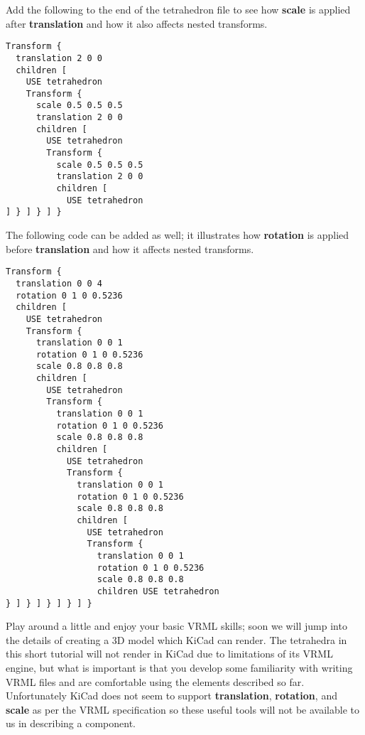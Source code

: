 \documentclass[a4paper]{article}
\begin{document}
Add the following to the end of the tetrahedron file to see how \textbf{scale} is applied after \textbf{translation}
and how it also affects nested transforms.

\begin{verbatim}
Transform {
  translation 2 0 0
  children [
    USE tetrahedron
    Transform {
      scale 0.5 0.5 0.5
      translation 2 0 0
      children [
        USE tetrahedron
        Transform {
          scale 0.5 0.5 0.5
          translation 2 0 0
          children [
            USE tetrahedron
] } ] } ] }
\end{verbatim}

The following code can be added as well; it illustrates how \textbf{rotation} is applied before \textbf{translation}
and how it affects nested transforms.

\begin{verbatim}
Transform {
  translation 0 0 4
  rotation 0 1 0 0.5236
  children [
    USE tetrahedron
    Transform {
      translation 0 0 1
      rotation 0 1 0 0.5236
      scale 0.8 0.8 0.8
      children [
        USE tetrahedron
        Transform {
          translation 0 0 1
          rotation 0 1 0 0.5236
          scale 0.8 0.8 0.8
          children [
            USE tetrahedron
            Transform {
              translation 0 0 1
              rotation 0 1 0 0.5236
              scale 0.8 0.8 0.8
              children [
                USE tetrahedron
                Transform {
                  translation 0 0 1
                  rotation 0 1 0 0.5236
                  scale 0.8 0.8 0.8
                  children USE tetrahedron
} ] } ] } ] } ] }
\end{verbatim}

Play around a little and enjoy your basic VRML skills; soon we will jump into the details of creating a
3D model which KiCad can render. The tetrahedra in this short tutorial will not render in KiCad due to
limitations of its VRML engine, but what is important is that you develop some familiarity with writing
VRML files and are comfortable using the elements described so far. Unfortunately KiCad does not seem to
support \textbf{translation}, \textbf{rotation}, and \textbf{scale} as per the VRML specification so these
useful tools will not be available to us in describing a component.
\end{document}
